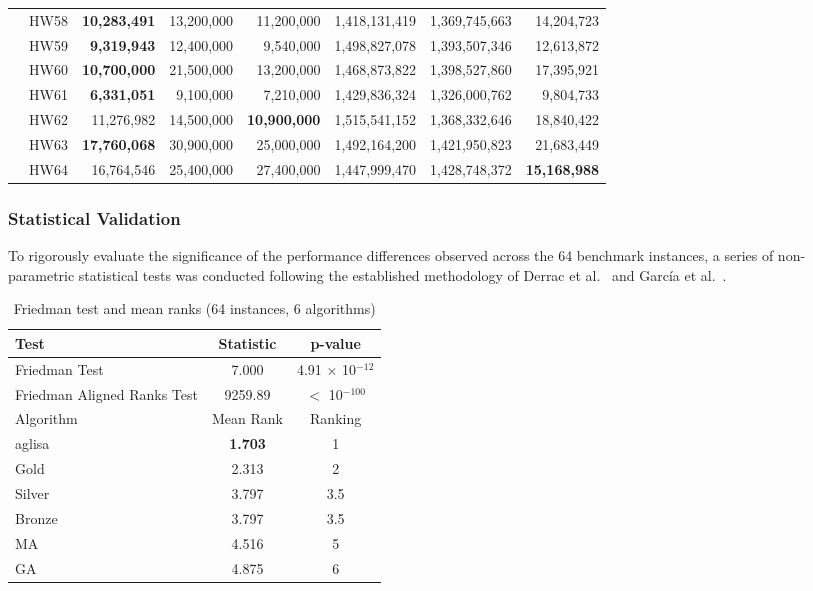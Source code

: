 \documentclass[]{interact}
\begin{document}
\begin{table}[htp]
{\begin{tabular}{l|r|r|r|r|r|r|r}
 & HW58 & \textbf{10,283,491} & 13,200,000 & 11,200,000 & 1,418,131,419 & 1,369,745,663 & {14,204,723} \\ 
    & HW59 & \textbf{9,319,943} & 12,400,000 & {9,540,000} & 1,498,827,078 & 1,393,507,346 & 12,613,872 \\ 
     & HW60 & \textbf{10,700,000} & 21,500,000 & 13,200,000 & 1,468,873,822 & 1,398,527,860 & {17,395,921} \\ 
     & HW61 & \textbf{6,331,051} & 9,100,000 & 7,210,000 & 1,429,836,324 & 1,326,000,762 & 9,804,733 \\ 
    & HW62 & 11,276,982 & 14,500,000 & \textbf{10,900,000} & 1,515,541,152 & 1,368,332,646 & {18,840,422} \\ 
 & HW63 & \textbf{17,760,068} & 30,900,000 & 25,000,000 & 1,492,164,200 & 1,421,950,823 & {21,683,449} \\ 
    & HW64 & {16,764,546} & 25,400,000 & 27,400,000 & 1,447,999,470 & 1,428,748,372 & \textbf{15,168,988} \\ 
    \hline
    \end{tabular}}
\end{table}

\subsubsection{Statistical Validation}

To rigorously evaluate the significance of the performance differences observed across the 64 benchmark instances, a series of non-parametric statistical tests was conducted following the established methodology of Derrac et al.~\cite{DERRAC20113} and Garc\'{i}a et al.~\cite{GARCIA20102044}.

\begin{table}[htp]
\centering
\caption{Friedman test and mean ranks (64 instances, 6 algorithms)}
\label{tab:friedman}
\begin{tabular}{lcc}
\toprule
Test & Statistic & p-value \\
\midrule
Friedman Test               & 7.000 & 4.91 $\times$ 10$^{-12}$ \\
Friedman Aligned Ranks Test & 9259.89 & $<$ 10$^{-100}$ \\
\midrule
Algorithm   & Mean Rank & Ranking \\
\midrule
\gls{aglisa}      & \textbf{1.703} & 1 \\
Gold        & 2.313          & 2 \\
Silver      & 3.797          & 3.5 \\
Bronze      & 3.797          & 3.5 \\
MA          & 4.516          & 5 \\
GA          & 4.875          & 6 \\
\bottomrule
\end{tabular}%
\end{table}
\end{document}
